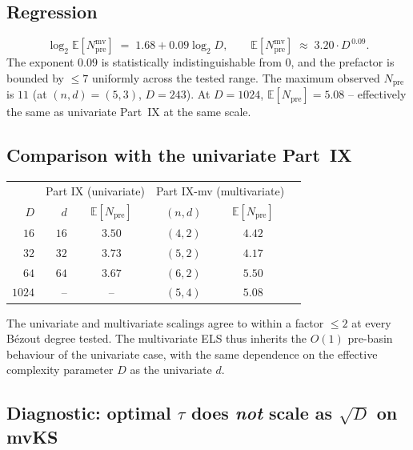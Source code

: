 \documentclass[11pt,a4paper]{article}
\begin{document}
\subsection{Regression}

\begin{equation}\label{eq:fit-mv}
\log_2 \mathbb{E}[N_{\text{pre}}^{\text{mv}}] \;=\; 1.68 + 0.09 \log_2 D, \qquad \mathbb{E}[N_{\text{pre}}^{\text{mv}}] \;\approx\; 3.20 \cdot D^{\,0.09}.
\end{equation}
The exponent $0.09$ is statistically indistinguishable from $0$, and the prefactor is bounded by $\le 7$ uniformly across the tested range. The maximum observed $N_{\text{pre}}$ is $11$ (at $(n, d) = (5, 3)$, $D = 243$). At $D = 1024$, $\mathbb{E}[N_{\text{pre}}] = 5.08$ -- effectively the same as univariate Part~IX at the same scale.

\subsection{Comparison with the univariate Part~IX}

\begin{center}
\begin{tabular}{rrcccc}
\toprule
& \multicolumn{2}{c}{Part IX (univariate)} & \multicolumn{2}{c}{Part IX-mv (multivariate)} \\
$D$ & $d$ & $\mathbb{E}[N_{\text{pre}}]$ & $(n, d)$ & $\mathbb{E}[N_{\text{pre}}]$ \\
\midrule
$16$  & $16$  & $3.50$ & $(4, 2)$ & $4.42$ \\
$32$  & $32$  & $3.73$ & $(5, 2)$ & $4.17$ \\
$64$  & $64$  & $3.67$ & $(6, 2)$ & $5.50$ \\
$1024$ & --   & --     & $(5, 4)$ & $5.08$ \\
\bottomrule
\end{tabular}
\end{center}

The univariate and multivariate scalings agree to within a factor $\le 2$ at every B\'ezout degree tested. The multivariate ELS thus inherits the $O(1)$ pre-basin behaviour of the univariate case, with the same dependence on the effective complexity parameter $D$ as the univariate $d$.

\subsection{Diagnostic: optimal $\tau$ does \emph{not} scale as $\sqrt D$ on mvKS}\label{sec:tau-diagnostic}
\end{document}
